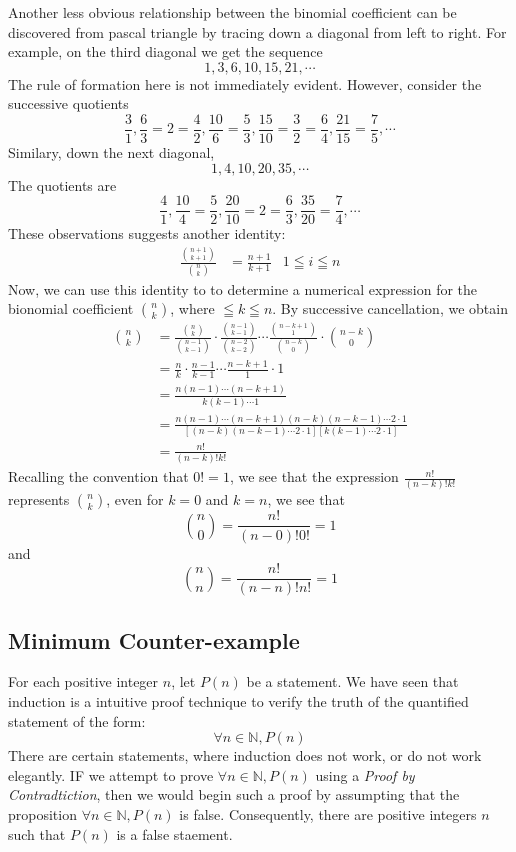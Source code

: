 \documentclass{book}
\theoremstyle{definition}
\theoremstyle{remark}
\newcommand{\bb}[1]{\mathbb{#1}}
\newcommand{\m}{\cdot}
\begin{document}
Another less obvious relationship between the binomial coefficient can be discovered from pascal triangle by tracing down a diagonal from left to right. For example, on the third diagonal we get the sequence $$ 1, 3, 6, 10, 15, 21, \cdots $$
The rule of formation here is not immediately evident. However, consider the successive quotients $$ \frac{3}{1}, \frac{6}{3} = 2 = \frac{4}{2}, \frac{10}{6} = \frac{5}{3}, \frac{15}{10} = \frac{3}{2} = \frac{6}{4}, \frac{21}{15} = \frac{7}{5}, \cdots $$
Similary, down the next diagonal, $$ 1, 4, 10, 20, 35, \cdots $$
The quotients are $$ \frac{4}{1}, \frac{10}{4} = \frac{5}{2}, \frac{20}{10} = 2 = \frac{6}{3}, \frac{35}{20} = \frac{7}{4}, \cdots $$
These observations suggests another identity: 
    \begin{align*}
        \frac{\binom{n+1}{k+1}}{\binom{n}{k}} &= \frac{n+1}{k+1} & 1 \leqq i \leqq n
    \end{align*}
Now, we can use this identity to to determine a numerical expression for the bionomial coefficient $\binom{n}{k}$, where $\leqq k \leqq n$. By successive cancellation, we obtain
    \begin{align*}
        \binom{n}{k} &= \frac{\binom{n}{k}}{\binom{n-1}{k-1}} \m \frac{\binom{n-1}{k-1}}{\binom{n-2}{k-2}} \cdots \frac{\binom{n-k+1}{1}}{\binom{n-k}{0}} \m \binom{n-k}{0} \\
            &= \frac{n}{k} \m \frac{n-1}{k-1} \cdots \frac{n-k+1}{1} \m 1 \\
            &= \frac{n(n-1) \cdots (n-k+1)}{k(k-1) \cdots 1} \\
            &= \frac{n(n-1) \cdots (n-k+1)(n-k)(n-k-1)\cdots 2 \m 1}{[(n-k)(n-k-1)\cdots 2 \m 1][k(k-1)\cdots 2 \m 1]} \\
            &= \frac{n!}{(n-k)!k!}
    \end{align*}
Recalling the convention that $0! = 1$, we see that the expression $\frac{n!}{(n-k)!k!}$ represents $\binom{n}{k}$, even for $k=0$ and $k=n$, we see that $$ \binom{n}{0} = \frac{n!}{(n-0)!0!}=1 $$ and $$ \binom{n}{n} = \frac{n!}{(n-n)!n!} = 1  $$


\newpage
\subsection{Minimum Counter-example}

For each positive integer $n$, let $P(n)$ be a statement. We have seen that induction is a intuitive proof technique to verify the truth of the quantified statement of the form:
    \begin{equation*}
        \forall n \in \bb{N}, P(n)
    \end{equation*}
There are certain statements, where induction does not work, or do not work elegantly. IF we attempt to prove $\forall n \in \bb{N}, P(n)$ using a \textit{Proof by Contradtiction}, then we would begin such a proof by assumpting that the proposition $\forall n \in \bb{N}, P(n)$ is false. Consequently, there are positive integers $n$ such that $P(n)$ is a false staement. \\
\end{document}
